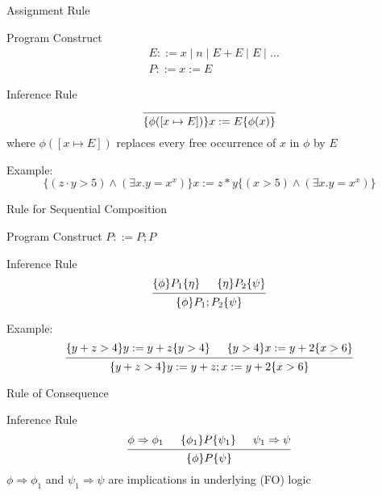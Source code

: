 \documentclass[presentation]{beamer}
\begin{document}
\begin{frame}[label={sec:org7b99118}]{Assignment Rule}
\begin{block}{Program Construct}
\begin{align*}
&E::= x\mid n\mid E+E\mid E\mid \dots\\
&P::=x:=E
\end{align*}
\end{block}

\begin{block}{Inference Rule}
\begin{equation*}
\begin{prooftree}%
\hypo{}
\infer1{\{\phi([x\mapsto E])\}x:=E\{\phi(x)\}}
\end{prooftree}
\end{equation*}
where \(\phi([x\mapsto E])\) replaces every free occurrence of \(x\) in \(\phi\) by \(E\)
\end{block}

Example:
\begin{equation*}
\{(z\cdot y>5)\wedge(\exists x.y=x^x)\}x:=z*y\{(x>5)\wedge(\exists x.y=x^x)\}
\end{equation*}
\end{frame}
\begin{frame}[label={sec:orgf362505}]{Rule for Sequential Composition}
\begin{block}{Program Construct}
\(P::=P;P\)
\end{block}

\begin{block}{Inference Rule}
\begin{equation*}
\begin{prooftree}%
\hypo{\{\phi\}P_1\{\eta\}}
\hypo{\{\eta\}P_2\{\psi\}}
\infer2{\{\phi\}P_1;P_2\{\psi\}}
\end{prooftree}
\end{equation*}
\end{block}

Example:
\begin{equation*}
\begin{prooftree}%
\hypo{\{y+z>4\}y:=y+z\{y>4\}}
\hypo{\{y>4\}x:=y+2\{x>6\}}
\infer2{\{y+z>4\}y:=y+z;x:=y+2\{x>6\}}
\end{prooftree}
\end{equation*}
\end{frame}
\begin{frame}[label={sec:orga24b83e}]{Rule of Consequence}
\begin{block}{Inference Rule}
\begin{equation*}
\begin{prooftree}%
\hypo{\phi\Rightarrow\phi_1}
\hypo{\{\phi_1\}P\{\psi_1\}}
\hypo{\psi_1\Rightarrow\psi}
\infer3{\{\phi\}P\{\psi\}}
\end{prooftree}
\end{equation*}
\(\phi\Rightarrow\phi_1\) and \(\psi_1\Rightarrow\psi\) are implications in underlying (FO) logic
\end{block}
\end{frame}
\end{document}
